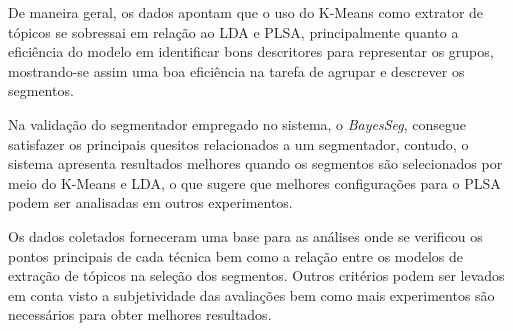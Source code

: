 

De maneira geral, os dados apontam que o uso do K-Means como extrator de tópicos se sobressai em relação ao LDA e PLSA, principalmente quanto a eficiência do modelo em identificar bons descritores para representar os grupos, mostrando-se assim uma boa eficiência na tarefa de agrupar e descrever os segmentos.

Na validação do segmentador empregado no sistema, o \textit{BayesSeg}, consegue satisfazer os principais quesitos relacionados a um segmentador, contudo, o sistema apresenta resultados melhores quando os segmentos são selecionados por meio do K-Means e LDA, o que sugere que melhores configurações para o PLSA podem ser analisadas em outros experimentos.


Os dados coletados forneceram uma base para as análises onde se verificou os pontos principais de cada técnica bem como a relação entre os modelos de extração de tópicos na seleção dos segmentos. Outros critérios podem ser levados em conta visto a subjetividade das avaliações bem como mais experimentos são necessários para obter melhores resultados.

